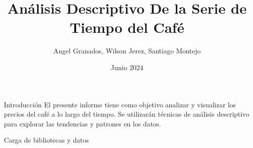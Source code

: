 \documentclass[
  10pt,
  ignorenonframetext,
  aspectratio=1612]{beamer}
\title{Análisis Descriptivo De la Serie de Tiempo del Café}
\author{Angel Granados, Wilson Jerez, Santiago Montejo}
\date{Junio 2024}
\newenvironment{Shaded}{\begin{snugshade}}{\end{snugshade}}
\newcommand{\CommentTok}[1]{\textcolor[rgb]{0.56,0.35,0.01}{\textit{#1}}}
\newcommand{\FunctionTok}[1]{\textcolor[rgb]{0.13,0.29,0.53}{\textbf{#1}}}
\newcommand{\NormalTok}[1]{#1}
\newcommand{\OtherTok}[1]{\textcolor[rgb]{0.56,0.35,0.01}{#1}}
\newcommand{\SpecialCharTok}[1]{\textcolor[rgb]{0.81,0.36,0.00}{\textbf{#1}}}
\newcommand{\StringTok}[1]{\textcolor[rgb]{0.31,0.60,0.02}{#1}}
\begin{document}
\frame{\titlepage}

\begin{frame}{Introducción}
\label{introducciuxf3n}
El presente informe tiene como objetivo analizar y visualizar los
precios del café a lo largo del tiempo. Se utilizarán técnicas de
análisis descriptivo para explorar las tendencias y patrones en los
datos.
\end{frame}

\begin{frame}[fragile]{Carga de bibliotecas y datos}
\label{carga-de-bibliotecas-y-datos}
\begin{Shaded}
\end{Shaded}
\end{frame}
\end{document}
